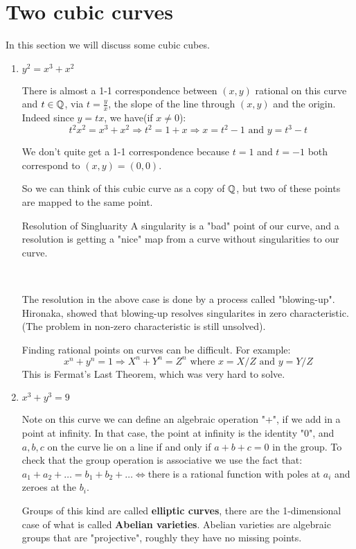 \section{Two cubic curves}
In this section we will discuss some cubic cubes.\begin{enumerate}
    \item $y^2 = x^3+x^2$
    
There is almost a 1-1 correspondence between $(x,y)$ rational on this curve and $t\in \mathbb{Q}$, via $t = \frac{y}{x}$, the slope of the line through $(x,y)$ and the origin. Indeed since $y=tx$, we have(if $x\neq 0$):\begin{equation}
    t^2x^2 = x^3+x^2 \Rightarrow t^2 = 1+x \Rightarrow x=t^2-1 \text{ and } y=t^3-t 
\end{equation}

We don't quite get a 1-1 correspondence because $t=1$ and $t=-1$ both correspond to $(x,y) = (0,0)$. 

So we can think of this cubic curve as a copy of $\mathbb{Q}$, but two of these points are mapped to the same point.

 Resolution of Singluarity
A singularity is a "bad" point of our curve, and a resolution is getting a "nice" map from a curve without singularities to our curve.

\

The resolution in the above case is done by a process called "blowing-up".
\remark Hironaka, showed that blowing-up resolves singularites in zero characteristic. (The problem in non-zero characteristic is still unsolved).

\remark Finding rational points on curves can be difficult. For example:\begin{equation}
    x^n + y^n = 1 \Rightarrow X^n+Y^n=Z^n \text{ where }x=X/Z \text{ and }y=Y/Z
\end{equation}
This is Fermat's Last Theorem, which was very hard to solve.

\item $x^3+y^3 = 9$

Note on this curve we can define an algebraic operation "+", if we add in a point at infinity.
In that case, the point at infinity is the identity "0", and $a,b,c$ on the curve lie on a line if and only if $a+b+c = 0$ in the group. To check that the group operation is associative we use the fact that: $a_1+a_2+\dots = b_1+b_2+\dots \iff $there is a rational function with poles at $a_i$ and zeroes at the $b_i$.

 Groups of this kind are called \textbf{elliptic curves}, there are the 1-dimensional case of what is called \textbf{Abelian varieties}. Abelian varieties are algebraic groups that are "projective", roughly they have no missing points.

\end{enumerate}

